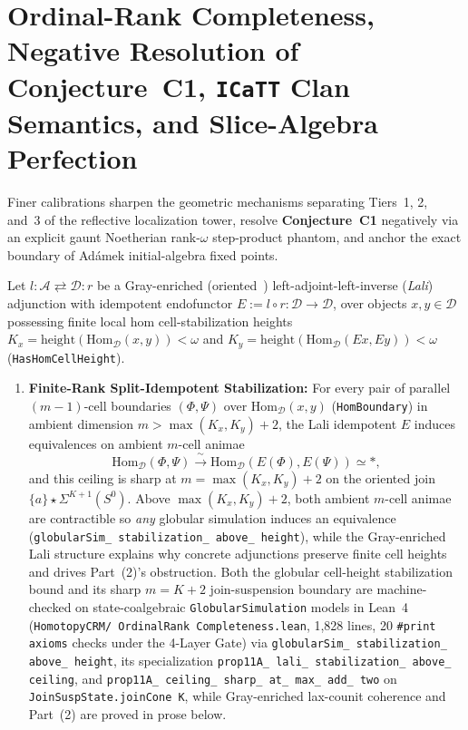\section{Ordinal-Rank Completeness, Negative Resolution of Conjecture~C1, \texttt{ICaTT} Clan Semantics, and Slice-Algebra Perfection}\label{subsec:ordinal-rank-icatt-perfection}

Finer calibrations sharpen the geometric mechanisms separating Tiers~1, 2, and~3 of the reflective localization tower, resolve \textbf{Conjecture~C1} negatively via an explicit gaunt Noetherian rank-$\omega$ step-product phantom, and anchor the exact boundary of Ad\'amek initial-algebra fixed points.

\begin{proposition}\label{prop:lali-ceiling}%
%
%
Let $l : \mathcal{A} \rightleftarrows \mathcal{D} : r$ be a Gray-enriched (oriented~\cite[Definition~3.5.1]{GepnerHeine26}) left-adjoint-left-inverse (\emph{Lali}) adjunction with idempotent endofunctor $E := l \circ r : \mathcal{D} \to \mathcal{D}$, over objects $x, y \in \mathcal{D}$ possessing finite local hom cell-stabilization heights $K_x = \mathrm{height}(\mathrm{Hom}_{\mathcal{D}}(x, y)) < \omega$ and $K_y = \mathrm{height}(\mathrm{Hom}_{\mathcal{D}}(E x, E y)) < \omega$ (\texttt{HasHomCellHeight}).
\begin{enumerate}
  \item \textbf{Finite-Rank Split-Idempotent Stabilization:} For every pair of parallel $(m-1)$-cell boundaries $(\Phi, \Psi)$ over $\mathrm{Hom}_{\mathcal{D}}(x, y)$ (\texttt{HomBoundary}) in ambient dimension $m > \max(K_x, K_y) + 2$, the Lali idempotent $E$ induces equivalences on ambient $m$-cell animae
  \[
    \mathrm{Hom}_{\mathcal{D}}(\Phi, \Psi) \xrightarrow{\;\sim\;} \mathrm{Hom}_{\mathcal{D}}(E(\Phi), E(\Psi)) \simeq *,
  \]
  and this ceiling is sharp at $m = \max(K_x, K_y) + 2$ on the oriented join $\{a\} \star \Sigma^{K+1}(S^0)$. Above $\max(K_x, K_y) + 2$, both ambient $m$-cell animae are contractible so \emph{any} globular simulation induces an equivalence (\texttt{globularSim\_ stabilization\_ above\_ height}), while the Gray-enriched Lali structure explains why concrete adjunctions preserve finite cell heights and drives Part~(2)'s obstruction. Both the globular cell-height stabilization bound and its sharp $m = K + 2$ join-suspension boundary are machine-checked on state-coalgebraic \texttt{GlobularSimulation} models in Lean~4 (\texttt{HomotopyCRM/ OrdinalRank Completeness.lean}, 1,828 lines, 20 \texttt{\#print axioms} checks under the 4-Layer Gate) via \texttt{globularSim\_ stabilization\_ above\_ height}, its specialization \texttt{prop11A\_ lali\_ stabilization\_ above\_ ceiling}, and \texttt{prop11A\_ ceiling\_ sharp\_ at\_ max\_ add\_ two} on \texttt{JoinSuspState.joinCone K}, while Gray-enriched lax-counit coherence and Part~(2) are proved in prose below.

\end{enumerate}
\end{proposition}
